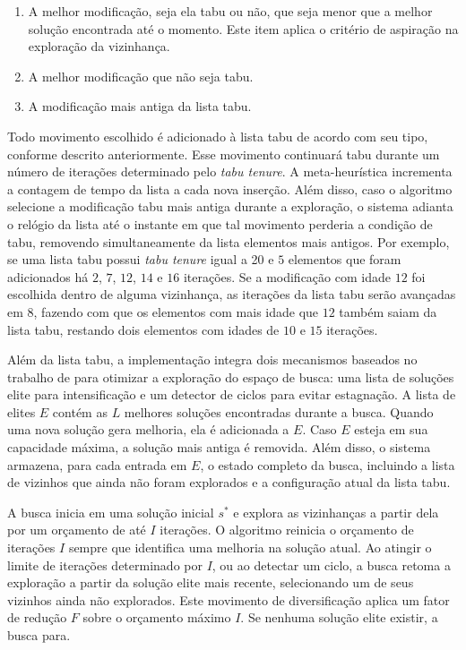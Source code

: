 \begin{enumerate}
    \item A melhor modificação, seja ela tabu ou não, que seja menor que a melhor solução encontrada até o momento. Este item aplica o critério de aspiração na exploração da vizinhança.
    \item A melhor modificação que não seja tabu.
    \item A modificação mais antiga da lista tabu.
\end{enumerate}

Todo movimento escolhido é adicionado à lista tabu de acordo com seu tipo, conforme descrito anteriormente. Esse movimento continuará tabu durante um número de iterações determinado pelo \textit{tabu tenure}. A meta-heurística incrementa a contagem de tempo da lista a cada nova inserção. Além disso, caso o algoritmo selecione a modificação tabu mais antiga durante a exploração, o sistema adianta o relógio da lista até o instante em que tal movimento perderia a condição de tabu, removendo simultaneamente da lista elementos mais antigos. Por exemplo, se uma lista tabu possui \textit{tabu tenure} igual a 20 e $5$ elementos que foram adicionados há $2$, $7$, $12$, $14$ e $16$ iterações. Se a modificação com idade $12$ foi escolhida dentro de alguma vizinhança, as iterações da lista tabu serão avançadas em $8$, fazendo com que os elementos com mais idade que $12$ também saiam da lista tabu, restando dois elementos com idades de $10$ e $15$ iterações.

Além da lista tabu, a implementação integra dois mecanismos baseados no trabalho de \cite{zubaran2016tabu} para otimizar a exploração do espaço de busca: uma lista de soluções elite para intensificação e um detector de ciclos para evitar estagnação. A lista de elites $E$ contém as $L$ melhores soluções encontradas durante a busca. Quando uma nova solução gera melhoria, ela é adicionada a $E$. Caso $E$ esteja em sua capacidade máxima, a solução mais antiga é removida. Além disso, o sistema armazena, para cada entrada em $E$, o estado completo da busca, incluindo a lista de vizinhos que ainda não foram explorados e a configuração atual da lista tabu.

A busca inicia em uma solução inicial $s^*$ e explora as vizinhanças a partir dela por um orçamento de até $I$ iterações. O algoritmo reinicia o orçamento de iterações $I$ sempre que identifica uma melhoria na solução atual. Ao atingir o limite de iterações determinado por $I$, ou ao detectar um ciclo, a busca retoma a exploração a partir da solução elite mais recente, selecionando um de seus vizinhos ainda não explorados. Este movimento de diversificação aplica um fator de redução $F$ sobre o orçamento máximo $I$. Se nenhuma solução elite existir, a busca para.

